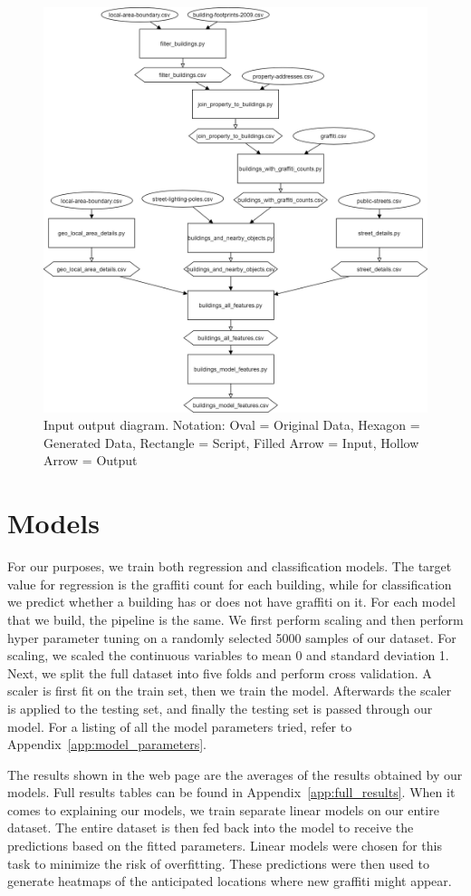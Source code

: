 \begin{figure}
   \centering
   \includegraphics[width=\textwidth]{images/MethodologyInputOutputDiagram.png}
   \caption{Input output diagram. Notation: Oval = Original Data, Hexagon = Generated Data, Rectangle = Script, Filled Arrow = Input, Hollow Arrow = Output}
   \label{fig:methodology}
\end{figure}


\section{Models}

For our purposes, we train both regression and classification models. The target value for regression is the graffiti count for each building, while for classification we predict whether a building has or does not have graffiti on it. For each model that we build, the pipeline is the same. We first perform scaling and then perform hyper parameter tuning on a randomly selected 5000 samples of our dataset. For scaling, we scaled the continuous variables to mean 0 and standard deviation 1. Next, we split the full dataset into five folds and perform cross validation. A scaler is first fit on the train set, then we train the model. Afterwards the scaler is applied to the testing set, and finally the testing set is passed through our model. For a listing of all the model parameters tried, refer to Appendix~\ref{app:model_parameters}.

The results shown in the web page are the averages of the results obtained by our models. Full results tables can be found in Appendix~\ref{app:full_results}. When it comes to explaining our models, we train separate linear models on our entire dataset. The entire dataset is then fed back into the model to receive the predictions based on the fitted parameters. Linear models were chosen for this task to minimize the risk of overfitting. These predictions were then used to generate heatmaps of the anticipated locations where new graffiti might appear.

